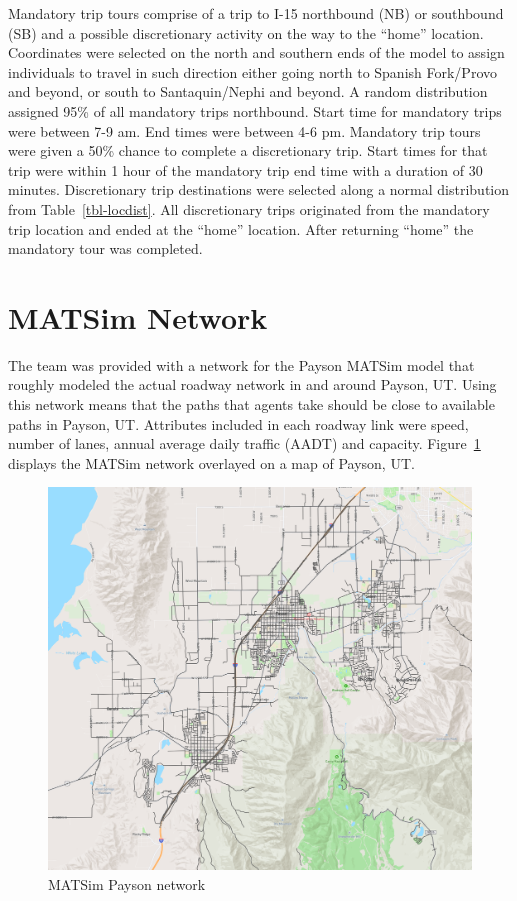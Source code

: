 \documentclass[
  letterpaper,
  DIV=11,
  numbers=noendperiod]{scrartcl}
\begin{document}
Mandatory trip tours comprise of a trip to I-15 northbound (NB) or
southbound (SB) and a possible discretionary activity on the way to the
``home'' location. Coordinates were selected on the north and southern
ends of the model to assign individuals to travel in such direction
either going north to Spanish Fork/Provo and beyond, or south to
Santaquin/Nephi and beyond. A random distribution assigned 95\% of all
mandatory trips northbound. Start time for mandatory trips were between
7-9 am. End times were between 4-6 pm. Mandatory trip tours were given a
50\% chance to complete a discretionary trip. Start times for that trip
were within 1 hour of the mandatory trip end time with a duration of 30
minutes. Discretionary trip destinations were selected along a normal
distribution from Table~\ref{tbl-locdist}. All discretionary trips
originated from the mandatory trip location and ended at the ``home''
location. After returning ``home'' the mandatory tour was completed.

\hypertarget{matsim-network}{%
\section{MATSim Network}\label{matsim-network}}

The team was provided with a network for the Payson MATSim model that
roughly modeled the actual roadway network in and around Payson, UT.
Using this network means that the paths that agents take should be close
to available paths in Payson, UT. Attributes included in each roadway
link were speed, number of lanes, annual average daily traffic (AADT)
and capacity. Figure~\ref{fig-network} displays the MATSim network
overlayed on a map of Payson, UT.

\begin{figure}

{\centering \includegraphics[width=5.72917in,height=\textheight]{matsim/network.png}

}

\caption{\label{fig-network}MATSim Payson network}

\end{figure}
\end{document}
